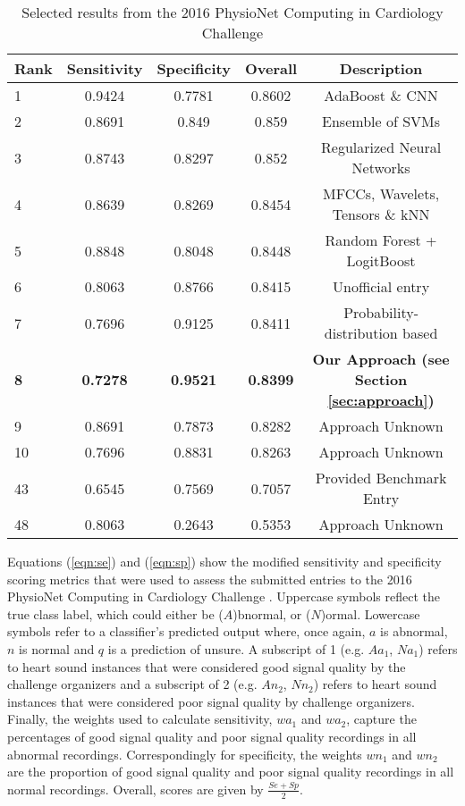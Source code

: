 \documentclass{article}
\begin{document}
\begin{table*}
  \centering
  \begin{tabular}{lcccc}
    \hline
    Rank & Sensitivity & Specificity & Overall & Description\\
    \hline
    1 &	0.9424	&	0.7781 &	0.8602	& AdaBoost \& CNN\\
    2 &	0.8691	&	0.849   &	0.859	& Ensemble of SVMs\\
    3 &	0.8743	&	0.8297 &	0.852	& Regularized Neural Networks\\
    4 & 	0.8639	&	0.8269 &	0.8454	& MFCCs, Wavelets, Tensors \& kNN\\
    5 & 	0.8848	&	0.8048 &	0.8448	& Random Forest + LogitBoost\\
    6 & 	0.8063	&	0.8766 &	0.8415	& Unofficial entry\\
    7 &	0.7696	&	0.9125 &	0.8411	& Probability-distribution based\\
    \bf{8} &	\bf{0.7278}	&	\bf{0.9521} &	\bf{0.8399}	& \bf{Our Approach (see Section \ref{sec:approach})}\\
    9 &	0.8691	&	0.7873 &	0.8282    	& Approach Unknown\\
    10 &	0.7696	&	0.8831 &	0.8263	& Approach Unknown\\
    \hline
    43 &	0.6545  &	0.7569 &	0.7057		& Provided Benchmark Entry\\
    48 &	0.8063	&	0.2643 &	0.5353	& Approach Unknown\\
    \hline    
  \end{tabular}
  \caption{Selected results from the 2016 PhysioNet Computing in Cardiology Challenge}
  \label{tab:results}
\end{table*}

Equations (\ref{eqn:se}) and (\ref{eqn:sp}) show the modified sensitivity and specificity scoring metrics that were used to assess the submitted entries to the 2016 PhysioNet Computing in Cardiology Challenge \cite{clifford2016classification}. Uppercase symbols reflect the true class label, which could either be ($A$)bnormal, or ($N$)ormal. Lowercase symbols refer to a classifier's predicted output where, once again, $a$ is abnormal, $n$ is normal and $q$ is a prediction of unsure. A subscript of 1 (e.g. $Aa_1$, $Na_1$) refers to heart sound instances that were considered good signal quality by the challenge organizers and a subscript of 2 (e.g. $An_2$, $Nn_2$) refers to heart sound instances that were considered poor signal quality by challenge organizers. Finally, the weights used to calculate sensitivity, $wa_1$ and $wa_2$, capture the percentages of good signal quality and poor signal quality recordings in all abnormal recordings. Correspondingly for specificity, the weights $wn_1$ and $wn_2$ are the proportion of good signal quality and poor signal quality recordings in all normal recordings. Overall, scores are given by $\frac{Se + Sp}{2}$.
\end{document}
